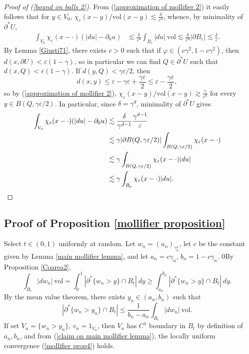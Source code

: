 \documentclass[reqno,12pt,letterpaper]{amsart}
\newcommand{\vol}{\mathrm{vol}}
\theoremstyle{definition}
\numberwithin{equation}{section}
\begin{document}
\begin{proof}[Proof of (\ref{bound on balls 2})]
From (\ref{approximation of mollifier 2}) it easily follows that for $y \in V_0$, $\chi_\varepsilon(x - y)/\vol(x - y) \lesssim \frac{\delta}{\varepsilon^d}$,
whence, by minimality of $\partial^* U$,
\begin{align*}
\int_{V_0} \chi_\varepsilon(x - \cdot)(|du| - \partial_0u) &\lesssim \frac{\delta}{\varepsilon^d} \int_{B_\varepsilon} |du| ~\vol \lesssim \frac{\delta}{\varepsilon^d} |\partial B_\varepsilon| \lesssim \frac{\delta}{\varepsilon}.
\end{align*}
By Lemma \ref{Giusti71}, there exists $c > 0$ such that if $\varphi \in (c\gamma^2, 1 - c\gamma^2)$, then $d(x, \partial U) < \varepsilon(1 - \gamma)$, so in particular we can find $Q \in \partial^* U$ such that $d(x, Q) < \varepsilon(1 - \gamma)$.
If $d(y, Q) < \gamma\varepsilon/2$, then
$$d(x, y) \leq \varepsilon - \gamma\varepsilon + \frac{\gamma\varepsilon}{2} \leq \varepsilon - \frac{\gamma\varepsilon}{2},$$
so by (\ref{approximation of mollifier 2}), $\chi_\varepsilon(x - y)/\vol(x - y) \gtrsim \frac{\gamma}{\varepsilon^d}$
for every $y \in B(Q, \gamma\varepsilon/2)$.
In particular, since $\delta = \gamma^d$, minimality of $\partial^* U$ gives
\begin{align*}
\int_{V_0} \chi_\varepsilon(x - \cdot)(|du| - \partial_0u) &\lesssim \frac{\delta}{\gamma^{d - 1}} \frac{\gamma^{d - 1}}{\varepsilon}\\
&\lesssim \gamma |\partial B(Q, \gamma\varepsilon/2)| \int_{B(Q, \gamma\varepsilon/2)} \chi_\varepsilon(x - \cdot) \\
&\lesssim \gamma \int_{B(Q, \gamma\varepsilon/2)} \chi_\varepsilon(x - \cdot) |du|\\
&\lesssim \gamma \int_{B_\varepsilon} \chi_\varepsilon(x - \cdot) |du|. \qedhere
\end{align*}
\end{proof}


\subsection{Proof of Proposition \ref{mollifier proposition}}
Select $t \in (0, 1)$ uniformly at random.
Let $w_n = (u_n)_{\gamma_n^4}$, let $c$ be the constant given by Lemma \ref{main mollifier lemma}, and let $a_n = c\gamma_n$, $b_n = 1 - c\gamma_n$.
0By Proposition \ref{Coarea2},
$$\int_{B_t} |dw_n| ~\vol = \int_0^1 |\partial^* \{w_n > y\} \cap B_t| ~dy \geq \int_{a_n}^{b_n} |\partial^* \{w_n > y\} \cap B_t| ~dy.$$
By the mean value theorem, there exists $y_n \in (a_n, b_n)$ such that
\begin{equation}\label{MVT mollifier}
|\partial^* \{w_n > y_n\} \cap B_t| \leq \frac{1}{b_n - a_n} \int_{B_t} |dw_n| ~\vol.
\end{equation}
If set $V_n = \{w_n > y_n\}$, $v_n = 1_{V_n}$, then $V_n$ has $C^1$ boundary in $B_t$ by definition of $a_n, b_n$, and from (\ref{claim on main mollifier lemma}), the locally uniform convergence (\ref{mollifier prop4}) holds.
\end{document}
